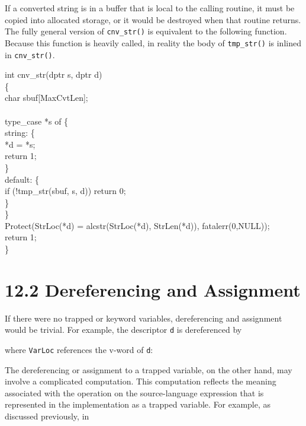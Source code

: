 If a converted string is in a buffer that is local to the calling
routine, it must be copied into allocated storage, or it would be
destroyed when that routine returns. The fully general version of
\texttt{cnv\_str()} is equivalent to the following function. Because
this function is heavily called, in reality the body of
\texttt{tmp\_str()} is inlined in \texttt{cnv\_str()}.

\begin{iconcode}
int cnv\_str(dptr s, dptr d)\\
\>\{\\
\>char sbuf[MaxCvtLen];\\
\\
\>type\_case *s of \{\\
\>\>string: \{\\
\>\>\>*d = *s;\\
\>\>\>return 1;\\
\>\>\>\}\\
\>\>default: \{\\
\>\>\>if (!tmp\_str(sbuf, s, d)) return 0;\\
\>\>\>\}\\
\>\>\}\\
\>Protect(StrLoc(*d) = alcstr(StrLoc(*d), StrLen(*d)), fatalerr(0,NULL));\\
\>return 1;\\
\>\}
\end{iconcode}

\section[12.2 Dereferencing and Assignment]{12.2 Dereferencing and Assignment}

If there were no trapped or keyword variables, dereferencing and assignment would
be trivial. For example, the descriptor \texttt{d} is dereferenced by


\noindent where \texttt{VarLoc} references the v-word of \texttt{d}:


The dereferencing or assignment to a trapped variable, on the other
hand, may involve a complicated computation. This computation reflects
the meaning associated with the operation on the source-language
expression that is represented in the implementation as a trapped
variable. For example, as discussed previously, in

